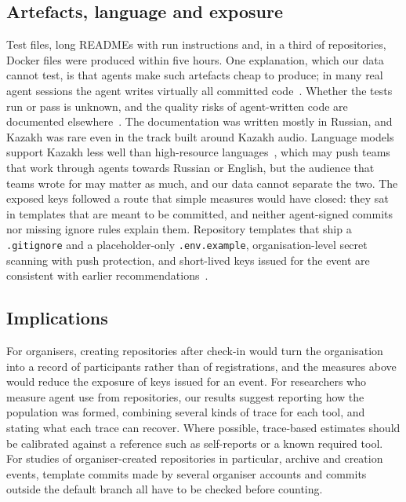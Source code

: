 \documentclass{article}
\begin{document}
\subsection{Artefacts, language and exposure}
Test files, long READMEs with run instructions and, in a third of repositories, Docker files were produced within five hours. One explanation, which our data cannot test, is that agents make such artefacts cheap to produce; in many real agent sessions the agent writes virtually all committed code~\cite{baumann2026swechat}. Whether the tests run or pass is unknown, and the quality risks of agent-written code are documented elsewhere~\cite{he2026cursor,zhao2025vibesafe,deng2026vibeinsecurity}. The documentation was written mostly in Russian, and Kazakh was rare even in the track built around Kazakh audio. Language models support Kazakh less well than high-resource languages~\cite{togmanov2025kazmmlu}, which may push teams that work through agents towards Russian or English, but the audience that teams wrote for may matter as much, and our data cannot separate the two. The exposed keys followed a route that simple measures would have closed: they sat in templates that are meant to be committed, and neither agent-signed commits nor missing ignore rules explain them. Repository templates that ship a \texttt{.gitignore} and a placeholder-only \texttt{.env.example}, organisation-level secret scanning with push protection, and short-lived keys issued for the event are consistent with earlier recommendations~\cite{meli2019git,krause2022pushed,basak2023tools}.

\subsection{Implications}
For organisers, creating repositories after check-in would turn the organisation into a record of participants rather than of registrations, and the measures above would reduce the exposure of keys issued for an event. For researchers who measure agent use from repositories, our results suggest reporting how the population was formed, combining several kinds of trace for each tool, and stating what each trace can recover. Where possible, trace-based estimates should be calibrated against a reference such as self-reports or a known required tool. For studies of organiser-created repositories in particular, archive and creation events, template commits made by several organiser accounts and commits outside the default branch all have to be checked before counting.
\end{document}
